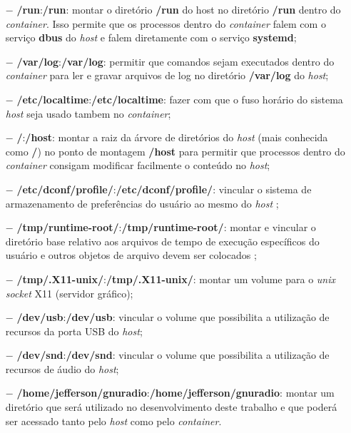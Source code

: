 \documentclass[
  12pt,				%
  openright,			%
  twoside,			%
  a4paper,			%
  english,			%
  french,				%
  spanish,			%
  brazil,				%
  ]{abntex2}
\begin{document}
\begin{itemize}
  \item[$-$] \textbf{/run}:\textbf{/run}: montar o diretório \textbf{/run} do host no diretório \textbf{/run} dentro do \textit{container}. Isso permite que os processos dentro do
        \textit{container} falem com o serviço \textbf{dbus} do \textit{host} e falem diretamente com o serviço \textbf{systemd};

  \item[$-$] \textbf{/var/log}:\textbf{/var/log}: permitir que comandos sejam executados dentro do \textit{container} para ler e gravar arquivos de log no diretório
        \textbf{/var/log} do \textit{host};

  \item[$-$] \textbf{/etc/localtime}:\textbf{/etc/localtime}: fazer com que o fuso horário do sistema \textit{host} seja usado
        tambem no \textit{container};

  \item[$-$] \textbf{/}:\textbf{/host}: montar a raiz da árvore de diretórios do \textit{host} (mais conhecida como \textbf{/}) no  ponto
        de montagem \textbf{/host} para permitir que processos dentro do \textit{container} consigam modificar facilmente o conteúdo no \textit{host};

  \item[$-$] \textbf{/etc/dconf/profile/}:\textbf{/etc/dconf/profile/}: vincular o sistema de armazenamento de preferências do usuário ao mesmo do \textit{host} \cite{RHEL-dconf-profile:2020};

  \item[$-$] \textbf{/tmp/runtime-root/}:\textbf{/tmp/runtime-root/}: montar e vincular o diretório base relativo aos arquivos de
        tempo de execução específicos do usuário e outros objetos de arquivo devem ser colocados ;

  \item[$-$] \textbf{/tmp/.X11-unix/}:\textbf{/tmp/.X11-unix/}: montar um volume para o \textit{unix socket} X11 (servidor gráfico);

  \item[$-$] \textbf{/dev/usb}:\textbf{/dev/usb}: vincular o volume que possibilita a utilização de recursos da porta USB do \textit{host};

  \item[$-$] \textbf{/dev/snd}:\textbf{/dev/snd}: vincular o volume que possibilita a utilização de recursos de áudio do \textit{host};

  \item[$-$] \textbf{/home/jefferson/gnuradio}:\textbf{/home/jefferson/gnuradio}: montar um diretório que será utilizado no desenvolvimento
        deste trabalho e que poderá ser acessado tanto pelo \textit{host} como pelo \textit{container}.
\end{itemize}
\end{document}
